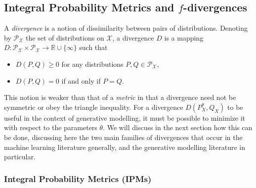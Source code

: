 \subsection{Integral Probability Metrics and $f$-divergences}\label{subsec:gen-model-divergence}

A \emph{divergence} is a notion of dissimilarity between pairs of distributions. 
Denoting by $\mathcal{P}_{\mathcal{X}}$ the set of distributions on $\mathcal{X}$, a divergence $D$ is a mapping $D: \mathcal{P}_{\mathcal{X}} \times \mathcal{P}_{\mathcal{X}} \to \mathbb{R} \cup \{\infty\}$ such that

\begin{itemize}
\item $D(P, Q)  \geq 0$ for any distributions $P, Q \in \mathcal{P}_{\mathcal{X}}$,
\item $D(P, Q) = 0$ if and only if $P = Q$.
\end{itemize}

This notion is weaker than that of a \emph{metric} in that a divergence need not be symmetric or obey the triangle inequality.
For a divergence $D(P^\theta_X, Q_X)$ to be useful in the context of generative modelling, it must be possible to minimize it with respect to the parameters $\theta$. 
We will discuss in the next section how this can be done, discussing here the two main families 
of divergences that occur in the machine learning literature generally, and the generative modelling literature in particular. 

\subsubsection{Integral Probability Metrics (IPMs)}\label{subsec:intro-ipm}


